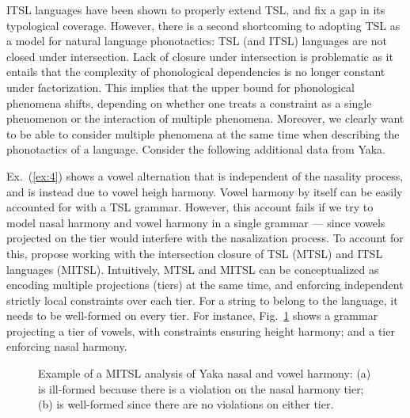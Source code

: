 \documentclass[11pt,a4paper]{article}
\begin{document}
ITSL languages have been shown to properly extend TSL, and fix a gap in its typological coverage. 
However, there is a second shortcoming to adopting TSL as a model for natural language phonotactics:  TSL (and ITSL) languages are not closed under intersection.
Lack of closure under intersection is problematic as it entails that the complexity of phonological dependencies is no longer constant under factorization.
This implies that the upper bound for phonological phenomena shifts, depending on whether one treats a constraint as a single phenomenon or the interaction of multiple phenomena.
Moreover, we clearly want to be able to consider multiple phenomena at the same time when describing the phonotactics of a language.
Consider the following additional data from Yaka.
\begin{exe}
    \ex\label{ex:4}\begin{xlist}
    	 \ex\label{ex:4a}    
	 \ex\label{ex:4b} 
	\end{xlist}
\end{exe}
Ex.~(\ref{ex:4}) shows a vowel alternation that is independent of the nasality process, and is instead due to vowel heigh harmony.
Vowel harmony by itself can be easily accounted for with a TSL grammar.
However, this account fails if we try to model nasal harmony and vowel harmony in a single grammar --- since vowels projected on the tier would interfere with the nasalization process.
To account for this, \citet{desanto2019structure} propose  working with the intersection closure of TSL (MTSL) and ITSL languages (MITSL).
Intuitively, MTSL and MITSL can be conceptualized as encoding multiple projections (tiers) at the same time, and enforcing independent strictly local constraints over each tier.
For a string to belong to the language, it needs to be well-formed on every tier.
For instance, Fig.~\ref{fig:YAKA3} shows a grammar projecting a tier of vowels, with constraints ensuring height harmony; and a tier enforcing nasal harmony.


\begin{figure}[]
\begin{center}
       
    
        \end{center}
        \caption{Example of a MITSL analysis of  Yaka nasal and vowel harmony: (a) is ill-formed because there is a violation on the nasal harmony tier; (b) is well-formed since there are no violations on either tier.}
        \label{fig:YAKA3}
        \end{figure}
\end{document}
